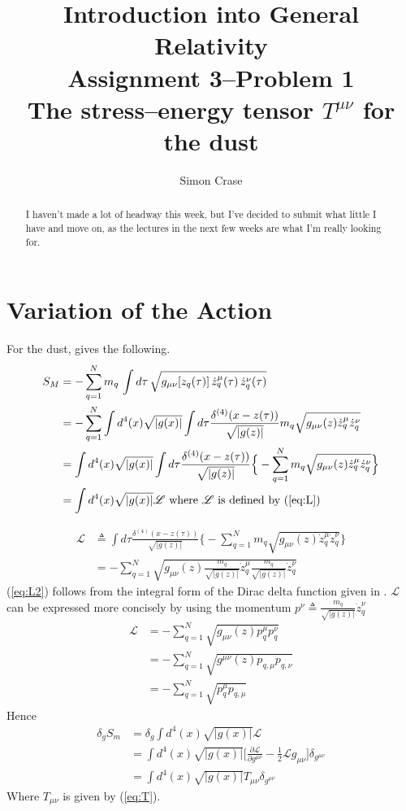 \documentclass[]{article}
\title{Introduction into General Relativity\\Assignment 3--Problem 1\\The stress--energy tensor $T^{\mu\nu}$ for the dust}
\author{Simon Crase}
\newcommand{\Lagr}{\mathscr{L}}
\begin{document}
\maketitle
\thispagestyle{fancy}
\begin{abstract}
I haven't made a lot of headway this week, but I've decided to submit what little I have and move on, as the lectures in the next few weeks are what I'm really looking for.


\end{abstract}

\section{Variation of the Action}

For the dust, \cite{akhmedev2016} gives the following.
\begin{align}
S_M &= - \sum_{q=1}^N m_q \, \int d\tau \, \sqrt{g_{\mu\nu}[z_q(\tau)] \, \dot{z}_q^\mu(\tau)\, \dot{z}_q^\nu(\tau)}\\
&=- \sum_{q=1}^N \int d^{4}(x) \sqrt{|g(x)|} \int d\tau\frac{\delta^{(4)}(x-z(\tau))}{ \sqrt{|g(z)|}} m_{q} \sqrt{ g_{\mu\nu}(z) \dot{z}_{q}^{\mu} \dot{z}_{q}^{\nu}}\\
&= \int d^{4}(x) \sqrt{|g(x)|} \int d\tau\frac{\delta^{(4)}(x-z(\tau))}{ \sqrt{|g(z)|}} \Big\{ - \sum_{q=1}^N m_{q} \sqrt{ g_{\mu\nu}(z) \dot{z}_{q}^{\mu} \dot{z}_{q}^{\nu}}\Big\}\\
&= \int d^{4}(x) \sqrt{|g(x)|} \Lagr  \text{   where $\Lagr$ is defined by (\ref{eq:L})}
\end{align}

\begin{align}
\Lagr &\triangleq \int d\tau\frac{\delta^{(4)}(x-z(\tau))}{ \sqrt{|g(z)|}} \Big\{ - \sum_{q=1}^N m_{q} \sqrt{ g_{\mu\nu}(z) \dot{z}_{q}^{\mu} \dot{z}_{q}^{\nu}}\Big\} \label{eq:L}\\
&= -\sum_{q=1}^N \sqrt{g_{\mu\nu}(z)\frac{m_q}{ \sqrt{|g(z)|}} \dot{z}_{q}^{\mu} \frac{m_q}{ \sqrt{|g(z)|}} \dot{z}_{q}^{\nu}}  \label{eq:L2}
\end{align}
(\ref{eq:L2}) follows from the integral form of the Dirac delta function given in \cite{wiki_delta}.  $\Lagr$ can be expressed more concisely by using the momentum $p^{\nu}\triangleq\frac{m_q}{ \sqrt{|g(z)|}} \dot{z}_{q}^{\nu}$
\begin{align}
\Lagr &= -\sum_{q=1}^N \sqrt{g_{\mu\nu}(z) p^{\mu}_q p^{\nu}_q} \\
&= -\sum_{q=1}^N \sqrt{g^{\mu\nu}(z) p_{q,\mu} p_{q,\nu}} \\
&= -\sum_{q=1}^N \sqrt{ p^{\mu}_q p_{q,\mu}}
\end{align}
Hence
\begin{align}
\delta_{g}S_m &= \delta_{g}  \int d^{4}(x) \sqrt{|g(x)|} \Lagr\\
&= \int d^{4}(x) \sqrt{|g(x)|} \Big[ \frac{\partial \Lagr}{\partial g^{\mu\nu}}-\frac{1}{2}\Lagr g_{\mu\nu}\Big] \delta_{g^{\mu\nu}}\\
&= \int d^{4}(x) \sqrt{|g(x)|} T_{\mu\nu} \delta_{g^{\mu\nu}} 
\end{align}
Where $T_{\mu\nu}$ is given by (\ref{eq:T}). 
\end{document}
